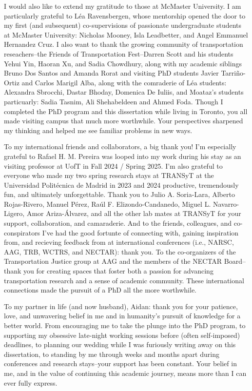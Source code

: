 \documentclass[
11pt, %
oneside, %
english, %
singlespacing, %
]{macthesis} %
\begin{document}
\begin{acknowledgements}
    I would also like to extend my gratitude to those at McMaster University. I am particularly grateful to Léa Ravensbergen, whose mentorship opened the door to my first (and subsequent) co-supervisions of passionate undergraduate students at McMaster University: Nicholas Mooney, Isla Leadbetter, and Angel Emmanuel Hernandez Cruz. I also want to thank the growing community of transportation reseachers--the Friends of Transportation Fest--Darren Scott and his students Yehui Yin, Haoran Xu, and Sadia Chowdhury, along with my academic siblings Bruno Dos Santos and Amanda Rorat and visiting PhD students Javier Tarriño-Ortiz and Carlos Marigil Alba, along with the comraderie of Léa students: Alexandra Sbrocchi, Dastar Bhoday, Domenica De Iuliis, and Moataz's students particuarly: Sadia Tasnim, Ali Shehabeldeen and Ahmed Foda. Though I completed the PhD program and this dissertation while living in Toronto, you all made visiting campus that much more worthwhile. Your perspectives sharpened my thinking and helped me see familiar problems in new ways.

    To my international friends and collaborators, a big thank you! I'm especially grateful to Rafael H. M. Pereira was looped into my work during his stay as an visiting professor at UofT in Fall 2024 / Spring 2025. I'm also grateful to everyone who made my two spring research stays at TRANSyT at the Universidad Politécnica de Madrid in 2023 and 2024 productive, tremendously fun, and ultimately unforgettable. Thank you to Julio A. Soria-Lara, Alberto Rojas-Rivero, Manuel Pérez, Raúl F. Elizondo-Candanedo, Miguel L. Navarro-Ligero, Amor Ariza-Álvarez, and all the other lab mates at TRANSyT for your support, collaboration, and camaraderie. And to the friends, colleagues, and co-conspirators I've had the good fortunte of connecting with, gaining inspiration from, and recieving feedback from at international conferences (i.e., NARSC, AAG, TRB, WCTRS, and NECTAR): thank you. To the co-organizers of the Transportation Justice group at AAG and the members of the NECTAR Board--thank you for creating spaces that foster both a passion for advancing transportation research and a sense of academic community. These international connections made the pursuit of a PhD all the more worthwhile.

    To my partner in life (and now husband), Aidan: thank you for your patience, love, and unwavering belief in me and in humanity's pursuit of knowledge for a better world. From encouraging me to take the plunge into the PhD program, to supporting my obsessive late-night working sessions before (often self-imposed) deadlines, to planning our wedding while I was furiously writing away on this dissertation, to standing by me through weeks and months apart during conferences and research stays--your support has been constant. Your belief in me, and in the value of continuing this academic journey, means more than I can ever fully express.


\end{acknowledgements}
\end{document}
